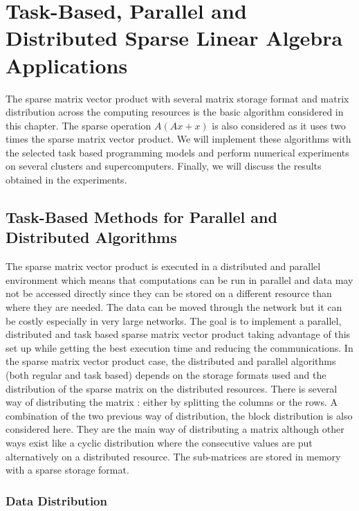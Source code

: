 %
\newcommand{\Array}{\KwSty{Array}}
\newcommand{\Integer}{\KwSty{Integer}}

\chapter{Task-Based, Parallel and Distributed Sparse Linear Algebra Applications \label{chap:exp_sparse}}
\graphicspath{{chapters/exp_sparse/}}

The sparse matrix vector product with several matrix storage format and matrix distribution across the computing resources is the basic algorithm considered in this chapter.
The sparse operation $A(Ax+x)$ is also considered as it uses two times the sparse matrix vector product.
We will implement these algorithms with the selected task based programming models and perform numerical experiments on several clusters and supercomputers.
Finally, we will discuss the results obtained in the experiments.


\section{Task-Based Methods for Parallel and Distributed Algorithms}
The sparse matrix vector product is executed in a distributed and parallel environment which means that computations can be run in parallel and data may not be accessed directly since they can be stored on a different resource than where they are needed.
The data can be moved through the network but it can be costly especially in very large networks.
The goal is to implement a parallel, distributed and task based sparse matrix vector product taking advantage of this set up while getting the best execution time and reducing the communications.
In the sparse matrix vector product case, the distributed and parallel algorithms (both regular and task based) depends on the storage formats used and the distribution of the sparse matrix on the distributed resources.
There is several way of distributing the matrix : either by splitting the columns or the rows.
A combination of the two previous way of distribution, the block distribution is also considered here.
They are the main way of distributing a matrix although other ways exist like a cyclic distribution where the consecutive values are put alternatively on a distributed resource.
The sub-matrices are stored in memory with a sparse storage format.


\subsection{Data Distribution \label{sec:sla:data_distribution}}

